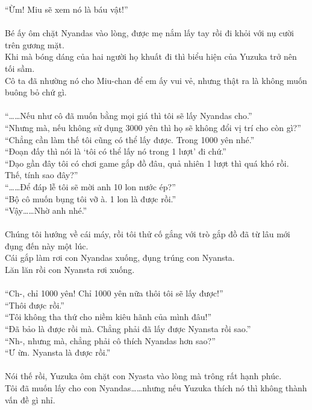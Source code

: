 \documentclass[12pt,a4paper, twosides]{book}
\begin{document}
“Ừm! Miu sẽ xem nó là báu vật!”\\
\\
Bé ấy ôm chặt Nyandas vào lòng, được mẹ nắm lấy tay rồi đi khỏi với nụ cười trên gương mặt.\\
Khi mà bóng dáng của hai người họ khuất đi thì biểu hiện của Yuzuka trở nên tối sầm.\\
Cô ta đã nhường nó cho Miu-chan để em ấy vui vẻ, nhưng thật ra là không muốn buông bỏ chứ gì.\\
\\
“……Nếu như cô đã muốn bằng mọi giá thì tôi sẽ lấy Nyandas cho.”\\
“Nhưng mà, nếu không sử dụng 3000 yên thì họ sẽ không đổi vị trí cho còn gì?”\\
“Chẳng cần làm thế tôi cũng có thể lấy được. Trong 1000 yên nhé.”\\
“Đoạn đấy thì nói là ‘tôi có thể lấy nó trong 1 lượt’ đi chứ.”\\
“Dạo gần đây tôi có chơi game gắp đồ đâu, quả nhiên 1 lượt thì quá khó rồi. Thế, tính sao đây?”\\
“……Để đáp lễ tôi sẽ mời anh 10 lon nước ép?”\\
“Bộ cô muốn bụng tôi vỡ à. 1 lon là được rồi.”\\
“Vậy……Nhờ anh nhé.”\\
\\
Chúng tôi hướng về cái máy, rồi tôi thử cố gắng với trò gắp đồ đã từ lâu mới đụng đến này một lúc.\\
Cái gắp làm rơi con Nyandas xuống, đụng trúng con Nyansta.\\
Lăn lăn rồi con Nyansta rơi xuống.\\
\\
“Ch-, chỉ 1000 yên! Chỉ 1000 yên nữa thôi tôi sẽ lấy được!”\\
“Thôi được rồi.”\\
“Tôi không tha thứ cho niềm kiêu hãnh của mình đâu!”\\
“Đã bảo là được rồi mà. Chẳng phải đã lấy được Nyansta rồi sao.”\\
“Nh-, nhưng mà, chẳng phải cô thích Nyandas hơn sao?”\\
“Ư ừn. Nyansta là được rồi.”\\
\\
Nói thế rồi, Yuzuka ôm chặt con Nyasta vào lòng mà trông rất hạnh phúc.\\
Tôi đã muốn lấy cho con Nyandas……nhưng nếu Yuzuka thích nó thì không thành vấn đề gì nhỉ.\\
\\
\end{document}
